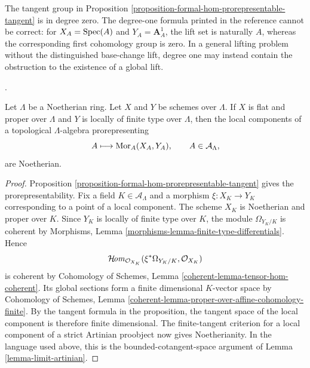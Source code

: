 \begin{remark}
\label{remark-formal-hom-tangent-degree}
The tangent group in Proposition
\ref{proposition-formal-hom-prorepresentable-tangent} is in degree zero.
The degree-one formula printed in the reference cannot be correct: for
$X_A = \mathop{\mathrm{Spec}}(A)$ and $Y_A = \mathbf{A}^1_A$, the lift set is naturally $A$,
whereas the corresponding first cohomology group is zero. In a general
lifting problem without the distinguished base-change lift, degree one may
instead contain the obstruction to the existence of a global lift.
\end{remark}

\begin{lemma}
\label{lemma-formal-hom-noetherian-components}
\begin{reference}
\cite[Expos\'e 195, A, Proposition 5.1, pp. 375--376 and
C, Corollaire, p. 382]{FGA}.
\end{reference}
Let $\Lambda$ be a Noetherian ring. Let $X$ and $Y$ be schemes over
$\Lambda$. If $X$ is flat and proper over $\Lambda$ and $Y$ is locally of
finite type over $\Lambda$, then the local components of a topological
$\Lambda$-algebra prorepresenting
$$
A \longmapsto \mathop{\mathrm{Mor}}\nolimits_A(X_A, Y_A), \qquad A \in \mathcal{A}_\Lambda,
$$
are Noetherian.
\end{lemma}

\begin{proof}
Proposition \ref{proposition-formal-hom-prorepresentable-tangent} gives the
prorepresentability. Fix a field $K \in \mathcal{A}_\Lambda$ and a morphism
$\xi : X_K \to Y_K$ corresponding to a point of a local component. The
scheme $X_K$ is Noetherian and proper over $K$. Since $Y_K$ is locally of
finite type over $K$, the module $\Omega_{Y_K/K}$ is coherent by Morphisms,
Lemma \ref{morphisms-lemma-finite-type-differentials}. Hence
$$
\mathop{\mathcal{H}\!\mathit{om}}\nolimits_{\mathcal{O}_{X_K}}
(\xi^*\Omega_{Y_K/K}, \mathcal{O}_{X_K})
$$
is coherent by Cohomology of Schemes, Lemma
\ref{coherent-lemma-tensor-hom-coherent}. Its global sections form a finite
dimensional $K$-vector space by Cohomology of Schemes, Lemma
\ref{coherent-lemma-proper-over-affine-cohomology-finite}.
By the tangent formula in the proposition, the tangent space of the local
component is therefore finite dimensional. The finite-tangent criterion for
a local component of a strict Artinian proobject now gives Noetherianity. In
the language used above, this is the bounded-cotangent-space argument of
Lemma \ref{lemma-limit-artinian}.
\end{proof}




























